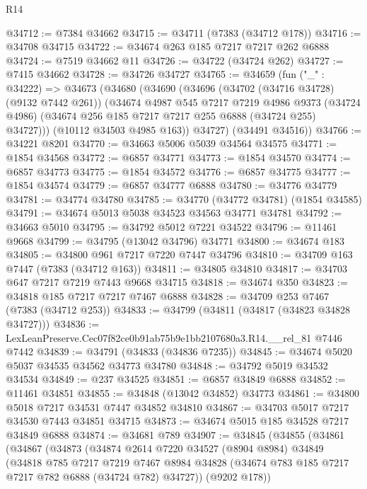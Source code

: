 \begin{lexlean}{R14}
\begin{coremodule}
@34712 := @7384 @34662
@34715 := @34711 (@7383 (@34712 @178))
@34716 := @34708 @34715
@34722 := @34674 @263 @185 @7217 @7217 @262 @6888
@34724 := @7519 @34662 @11
@34726 := @34722 (@34724 @262)
@34727 := @7415 @34662
@34728 := @34726 @34727
@34765 := @34659
    (fun ("_" : @34222) =>
    @34673
      (@34680
        (@34690
          (@34696
            (@34702 (@34716 @34728) (@9132 @7442 @261))
            (@34674
              @4987
              @545
              @7217
              @7219
              @4986
              @9373
              (@34724 @4986)
              (@34674 @256 @185 @7217 @7217 @255 @6888 (@34724 @255) @34727)))
          (@10112 @34503 @4985 @163))
        @34727)
      (@34491 @34516))
@34766 := @34221 @8201
@34770 := @34663 @5006 @5039 @34564 @34575
@34771 := @1854 @34568
@34772 := @6857 @34771
@34773 := @1854 @34570
@34774 := @6857 @34773
@34775 := @1854 @34572
@34776 := @6857 @34775
@34777 := @1854 @34574
@34779 := @6857 @34777 @6888
@34780 := @34776 @34779
@34781 := @34774 @34780
@34785 := @34770 (@34772 @34781) (@1854 @34585)
@34791 := @34674 @5013 @5038 @34523 @34563 @34771 @34781
@34792 := @34663 @5010
@34795 := @34792 @5012 @7221 @34522
@34796 := @11461 @9668
@34799 := @34795 (@13042 @34796) @34771
@34800 := @34674 @183
@34805 := @34800 @961 @7217 @7220 @7447 @34796
@34810 := @34709 @163 @7447 (@7383 (@34712 @163))
@34811 := @34805 @34810
@34817 := @34703 @647 @7217 @7219 @7443 @9668 @34715
@34818 := @34674 @350
@34823 := @34818 @185 @7217 @7217 @7467 @6888
@34828 := @34709 @253 @7467 (@7383 (@34712 @253))
@34833 := @34799 (@34811 (@34817 (@34823 @34828 @34727)))
@34836 := LexLeanPreserve.Cec07f82ce0b91ab75b9e1bb2107680a3.R14.__rel_81 @7446 @7442
@34839 := @34791 (@34833 (@34836 @7235))
@34845 := @34674 @5020 @5037 @34535 @34562 @34773 @34780
@34848 := @34792 @5019 @34532 @34534
@34849 := @237 @34525
@34851 := @6857 @34849 @6888
@34852 := @11461 @34851
@34855 := @34848 (@13042 @34852) @34773
@34861 := @34800 @5018 @7217 @34531 @7447 @34852 @34810
@34867 := @34703 @5017 @7217 @34530 @7443 @34851 @34715
@34873 := @34674 @5015 @185 @34528 @7217 @34849 @6888
@34874 := @34681 @789
@34907 := @34845
    (@34855
      (@34861
        (@34867
          (@34873
            (@34874
              @2614
              @7220
              @34527
              (@8904 @8984)
              @34849
              (@34818
                @785
                @7217
                @7219
                @7467
                @8984
                @34828
                (@34674 @783 @185 @7217 @7217 @782 @6888 (@34724 @782) @34727))
              (@9202 @178))

\end{coremodule}
\end{lexlean}
